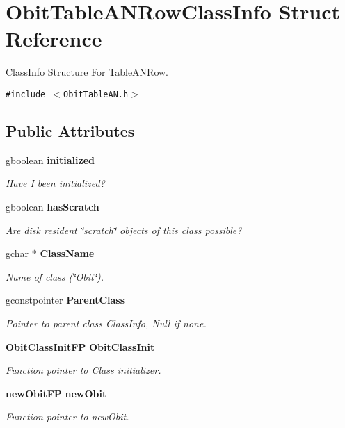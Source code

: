 \section{Obit\-Table\-ANRow\-Class\-Info Struct Reference}
\label{structObitTableANRowClassInfo}
Class\-Info Structure For Table\-ANRow.  


{\tt \#include $<$Obit\-Table\-AN.h$>$}

\subsection*{Public Attributes}
\begin{CompactItemize}
\item 
gboolean {\bf initialized}
\begin{CompactList}\small\item\em Have I been initialized? \item\end{CompactList}\item 
gboolean {\bf has\-Scratch}
\begin{CompactList}\small\item\em Are disk resident \char`\"{}scratch\char`\"{} objects of this class possible? \item\end{CompactList}\item 
gchar $\ast$ {\bf Class\-Name}
\begin{CompactList}\small\item\em Name of class (\char`\"{}Obit\char`\"{}). \item\end{CompactList}\item 
gconstpointer {\bf Parent\-Class}
\begin{CompactList}\small\item\em Pointer to parent class Class\-Info, Null if none. \item\end{CompactList}\item 
{\bf Obit\-Class\-Init\-FP} {\bf Obit\-Class\-Init}
\begin{CompactList}\small\item\em Function pointer to Class initializer. \item\end{CompactList}\item 
{\bf new\-Obit\-FP} {\bf new\-Obit}
\begin{CompactList}\small\item\em Function pointer to new\-Obit. \item\end{CompactList}\item 

\end{CompactItemize}
